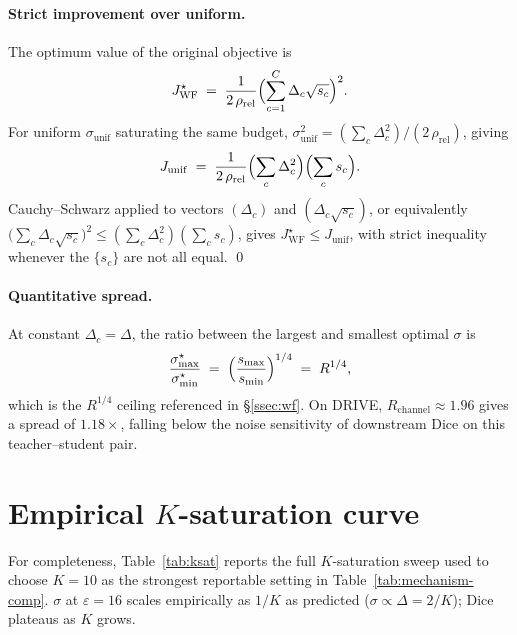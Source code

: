\paragraph{Strict improvement over uniform.}
The optimum value of the original objective is
\begin{equation}
J_{\mathrm{WF}}^{\star}
 \;=\; \frac{1}{2\,\rho_{\mathrm{rel}}}
       \Bigl(\sum_{c=1}^{C}\Delta_c\sqrt{s_c}\Bigr)^{2}.
\label{eq:wf-obj}
\end{equation}
For uniform $\sigma_{\mathrm{unif}}$ saturating the same budget,
$\sigma_{\mathrm{unif}}^{2} = (\sum_c \Delta_c^{2})/(2\,\rho_{\mathrm{rel}})$,
giving
\begin{equation}
J_{\mathrm{unif}}
 \;=\; \frac{1}{2\,\rho_{\mathrm{rel}}}
       \Bigl(\sum_{c}\Delta_c^{2}\Bigr)\Bigl(\sum_{c}s_c\Bigr).
\label{eq:unif-obj}
\end{equation}
Cauchy--Schwarz applied to vectors $(\Delta_c)$ and
$(\Delta_c\sqrt{s_c})$, or equivalently
$\bigl(\sum_c \Delta_c\sqrt{s_c}\bigr)^{2}
 \le (\sum_c \Delta_c^{2})(\sum_c s_c)$, gives
$J_{\mathrm{WF}}^{\star} \le J_{\mathrm{unif}}$, with strict inequality
whenever the $\{s_c\}$ are not all equal. \qed

\paragraph{Quantitative spread.}
At constant $\Delta_c=\Delta$, the ratio between the largest and
smallest optimal $\sigma$ is
\begin{equation*}
\frac{\sigma^{\star}_{\max}}{\sigma^{\star}_{\min}}
 \;=\; \Bigl(\frac{s_{\max}}{s_{\min}}\Bigr)^{1/4}
 \;=\; R^{1/4},
\end{equation*}
which is the $R^{1/4}$ ceiling referenced in \S\ref{ssec:wf}. On
DRIVE, $R_{\mathrm{channel}} \approx 1.96$ gives a spread of
$1.18\times$, falling below the noise sensitivity of downstream Dice
on this teacher--student pair.

\section{Empirical $K$-saturation curve}
\label{app:k-sat}

For completeness, Table~\ref{tab:ksat} reports the full $K$-saturation
sweep used to choose $K{=}10$ as the strongest reportable setting in
Table~\ref{tab:mechanism-comp}. $\sigma$ at $\varepsilon{=}16$ scales
empirically as $1/K$ as predicted ($\sigma\!\propto\!\Delta\!=\!2/K$);
Dice plateaus as $K$ grows.

